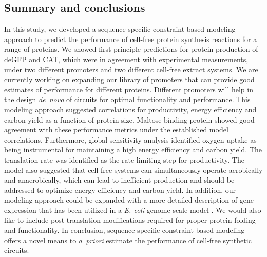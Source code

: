\documentclass[journal=asbcd6,manuscript=article]{achemso}
\begin{document}

\subsection{Summary and conclusions}
In this study, we developed a sequence specific constraint based modeling approach to predict the performance of cell-free protein synthesis reactions for a range of proteins.
We showed first principle predictions for protein production of deGFP and CAT, which were in agreement with experimental measurements, under two different promoters and two different cell-free extract systems.
We are currently working on expanding our library of promoters that can provide good estimates of performance for different proteins.
Different promoters will help in the design \emph{de~novo} of circuits for optimal functionality and performance.
This modeling approach suggested correlations for productivity, energy efficiency and carbon yield as a function of protein size.
Maltose binding protein showed good agreement with these performance metrics under the established model correlations.
Furthermore, global sensitivity analysis identified oxygen uptake as being instrumental for maintaining a high energy efficiency and carbon yield.
The translation rate was identified as the rate-limiting step for productivity.
The model also suggested that cell-free systems can simultaneously operate aerobically and anaerobically, which can lead to inefficient production and should be addressed to optimize energy efficiency and carbon yield.
In addition, our modeling approach could be expanded with a more detailed description of gene expression that has been utilized in a \emph{E. coli} genome scale model \cite{Brien693}.
We would also like to include post-translation modifications required for proper protein folding and functionality.
In conclusion, sequence specific constraint based modeling offers a novel means to \emph{a~priori} estimate the performance of cell-free synthetic circuits.
\end{document}
